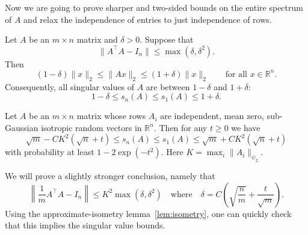 Now we are going to prove sharper and two-sided bounds on the entire spectrum of $A$ 
and relax the independence of entries to just independence of rows.

\begin{lem}
\label{lem:isometry}
Let $A$ be an $m \times n$ matrix and $\delta > 0$. Suppose that
\[
\|A^\top A - I_n\| \leq \max(\delta, \delta^2).
\]
Then
\[
(1 - \delta) \|x\|_2 \leq \|Ax\|_2 \leq (1 + \delta) \|x\|_2 \qquad \text{for all } x \in \mathbb{R}^n.
\]
Consequently, all singular values of $A$ are between $1 - \delta$ and $1 + \delta$:
\[
1 - \delta \leq s_n(A) \leq s_1(A) \leq 1 + \delta.
\]
\end{lem}

\begin{thm}
Let $A$ be an $m \times n$ matrix whose rows $A_i$ are independent, mean zero, sub-Gaussian isotropic random vectors in $\mathbb{R}^n$. Then for any $t \geq 0$ we have
\[
\sqrt{m} - C K^2 (\sqrt{n} + t) \leq s_n(A) \leq s_1(A) \leq \sqrt{m} + C K^2 (\sqrt{n} + t)
\]
with probability at least $1 - 2 \exp(-t^2)$. Here $K = \max_i \|A_i\|_{\psi_2}$.
\end{thm}

We will prove a slightly stronger conclusion, namely that
\[
\left\| \frac{1}{m} A^\top A - I_n \right\| \leq K^2 \max(\delta, \delta^2) \quad \text{where} \quad \delta = C\!\left( \sqrt{\frac{n}{m}} + \frac{t}{\sqrt{m}} \right).
\]
Using the approximate-isometry lemma~\ref{lem:isometry}, one can quickly check that this implies the singular value bounds.

